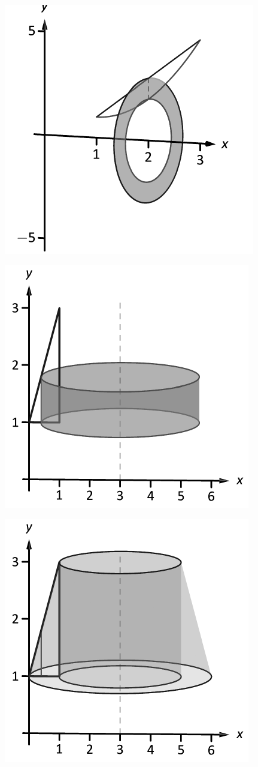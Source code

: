 \documentclass[10pt]{article}
\begin{document}
\includegraphics{figshell2a_3DBW.pdf}
\texttt{}

\includegraphics{figshell2b_3DBW.pdf}
\texttt{}

\includegraphics{figshell2c_3DBW.pdf}
\texttt{}
\end{document}

